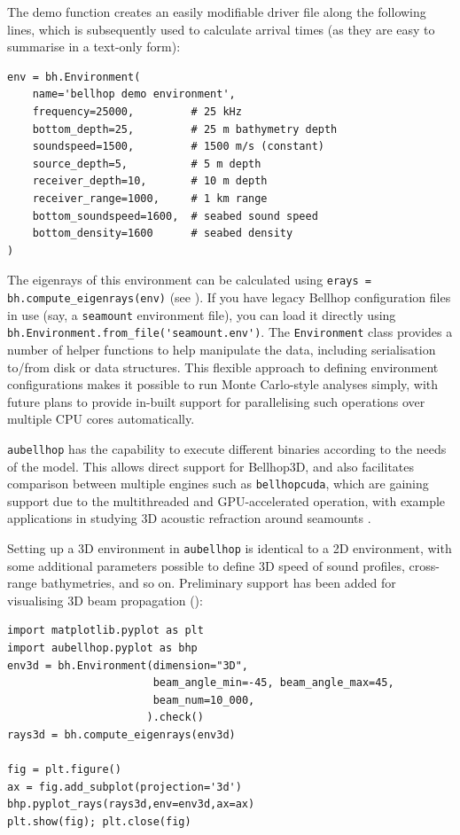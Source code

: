 \documentclass{internoise2026-wr}
\begin{document}
The demo function creates an easily modifiable driver file along the following lines, which is subsequently used to calculate arrival times (as they are easy to summarise in a text-only form):
\small
\begin{verbatim}
env = bh.Environment(
    name='bellhop demo environment',
    frequency=25000,         # 25 kHz
    bottom_depth=25,         # 25 m bathymetry depth
    soundspeed=1500,         # 1500 m/s (constant)
    source_depth=5,          # 5 m depth
    receiver_depth=10,       # 10 m depth
    receiver_range=1000,     # 1 km range
    bottom_soundspeed=1600,  # seabed sound speed
    bottom_density=1600      # seabed density
)
\end{verbatim}
\normalsize
The eigenrays of this environment can be calculated using \verb|erays = bh.compute_eigenrays(env)| (see ).
If you have legacy Bellhop configuration files in use (say, a \texttt{seamount} environment file), you can load it directly using \verb|bh.Environment.from_file('seamount.env')|.
The \texttt{Environment} class provides a number of helper functions to help manipulate the data, including serialisation to/from disk or data structures.
This flexible approach to defining environment configurations makes it possible to run Monte Carlo-style analyses simply, with future plans to provide in-built support for parallelising such operations over multiple CPU cores automatically.


\texttt{aubellhop} has the capability to execute different binaries according to the needs of the model.
This allows direct support for Bellhop3D, and also facilitates comparison between multiple engines such as \texttt{bellhopcuda}, which are gaining support due to the multithreaded and GPU-accelerated operation, with example applications in studying 3D acoustic refraction around seamounts \cite{jerome2025-jasa}.

Setting up a 3D environment in \texttt{aubellhop} is identical to a 2D environment, with some additional parameters possible to define 3D speed of sound profiles, cross-range bathymetries, and so on.
Preliminary support has been added for visualising 3D beam propagation ():
\small
\begin{verbatim}
import matplotlib.pyplot as plt
import aubellhop.pyplot as bhp
env3d = bh.Environment(dimension="3D",
                       beam_angle_min=-45, beam_angle_max=45,
                       beam_num=10_000,
                      ).check()
rays3d = bh.compute_eigenrays(env3d)

fig = plt.figure()
ax = fig.add_subplot(projection='3d')
bhp.pyplot_rays(rays3d,env=env3d,ax=ax)
plt.show(fig); plt.close(fig)
\end{verbatim}
\normalsize
\end{document}
